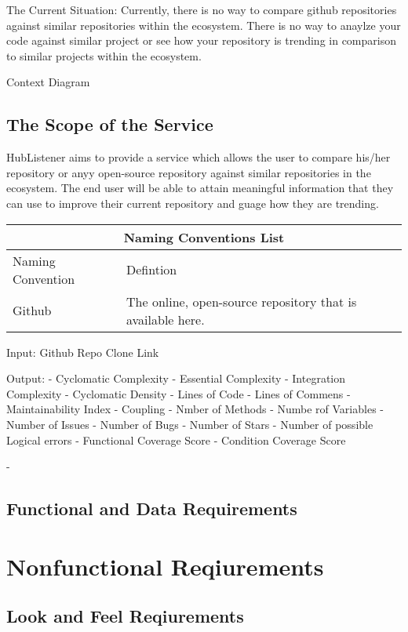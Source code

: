 \documentclass{article}
\begin{document}
The Current Situation: 
Currently, there is no way to compare github repositories against similar repositories within the ecosystem. There is no way to anaylze your code against similar project or see how your repository is trending in comparison to similar projects within the ecosystem. 


Context Diagram 

\subsection{The Scope of the Service}
HubListener aims to provide a service which allows the user to compare his/her repository or anyy open-source repository against similar repositories in the ecosystem. The end user will  be able to attain meaningful information that they can use to improve their current repository and guage how they are trending. 
\newline

\begin{tabular}{ |p{6cm}||p{6cm}|  }
 \hline
 \multicolumn{2}{|c|}{Naming Conventions List} \\
 \hline
 Naming        Convention & Defintion\\
 \hline 
Github & The online, open-source repository that is available here. \\
\hline
\end{tabular}

Input: 
Github Repo Clone Link

Output:
- Cyclomatic  Complexity 
- Essential Complexity 
- Integration Complexity 
- Cyclomatic Density
- Lines of Code 
- Lines of Commens
- Maintainability Index
- Coupling 
- Nmber of Methods
- Numbe rof Variables 
- Number of Issues
- Number of Bugs
- Number of Stars
- Number of possible Logical errors 
- Functional Coverage Score
- Condition Coverage Score


- 
\subsection{Functional and Data Requirements }

\newpage
\section{Nonfunctional Reqiurements}

\subsection{Look and Feel Reqiurements}
\end{document}
